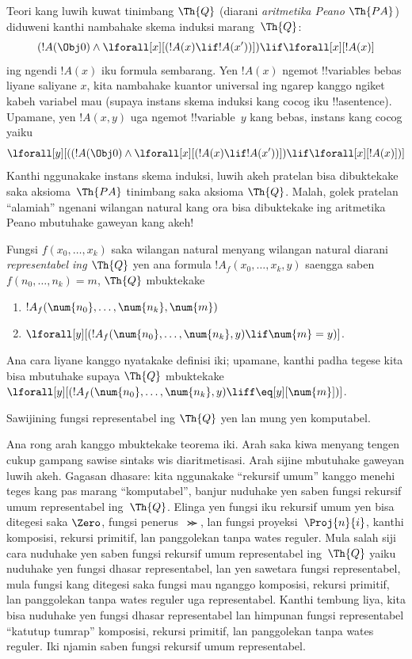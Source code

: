 \documentclass[../../../include/open-logic-section]{subfiles}
\begin{document}
Teori kang luwih kuwat tinimbang $\Th{Q}$ (diarani
\emph{aritmetika Peano} $\Th{PA}$) diduweni kanthi nambahake
skema induksi marang~$\Th{Q}$:
\[
(!A(\Obj 0) \land \lforall[x][(!A(x) \lif !A(x'))]) \lif \lforall[x][!A(x)]
\]
ing ngendi $!A(x)$ iku formula sembarang. Yen $!A(x)$ ngemot
!!{variable}s bebas liyane saliyane $x$, kita nambahake
kuantor universal ing ngarep kanggo ngiket kabeh variabel mau
(supaya instans skema induksi kang cocog iku !!a{sentence}).
Upamane, yen $!A(x, y)$ uga ngemot !!{variable}~$y$ kang
bebas, instans kang cocog yaiku
\[
\lforall[y][((!A(\Obj 0) \land \lforall[x][(!A(x) \lif !A(x'))]) \lif
  \lforall[x][!A(x)])]
\]
Kanthi nggunakake instans skema induksi, luwih akeh pratelan
bisa dibuktekake saka aksioma~$\Th{PA}$ tinimbang saka
aksioma $\Th{Q}$. Malah, golek pratelan ``alamiah'' ngenani
wilangan natural kang ora bisa dibuktekake ing aritmetika Peano
mbutuhake gaweyan kang akeh!{}

\begin{defn}
  Fungsi $f(x_0,\ldots,x_k)$ saka wilangan natural menyang
  wilangan natural diarani {\em representabel ing $\Th{Q}$} yen
  ana formula $!A_f(x_0,\dots,x_k,y)$ saengga saben
  $f(n_0,\dots,n_k) = m$, $\Th{Q}$ mbuktekake
\begin{enumerate}
\item{} $!A_f(\num{n_0}, \dots, \num{n_k}, \num{m})$
\item{} $\lforall[y][(!A_f(\num{n_0}, \dots,
\num{n_k}, y) \lif \num{m} = y)]$.
\end{enumerate}
\end{defn}

Ana cara liyane kanggo nyatakake definisi iki; upamane,
kanthi padha tegese kita bisa mbutuhake supaya $\Th{Q}$
mbuktekake $\lforall[y][(!A_f(\num{n_0}, \dots,
\num{n_k}, y) \liff \eq[y][\num{m}])]$.

\begin{thm}
Sawijining fungsi representabel ing $\Th{Q}$ yen lan mung yen komputabel.
\end{thm}

Ana rong arah kanggo mbuktekake teorema iki. Arah saka kiwa
menyang tengen cukup gampang sawise sintaks wis diaritmetisasi.
Arah sijine mbutuhake gaweyan luwih akeh. Gagasan dhasare:
kita nggunakake ``rekursif umum'' kanggo menehi teges kang
pas marang ``komputabel'', banjur nuduhake yen saben fungsi
rekursif umum representabel ing~$\Th{Q}$. Elinga yen fungsi
iku rekursif umum yen bisa ditegesi saka $\Zero$, fungsi
penerus~$\Succ$, lan fungsi proyeksi~$\Proj{n}{i}$, kanthi
komposisi, rekursi primitif, lan panggolekan tanpa wates reguler.
Mula salah siji cara nuduhake yen saben fungsi rekursif umum
representabel ing~$\Th{Q}$ yaiku nuduhake yen fungsi dhasar
representabel, lan yen sawetara fungsi representabel, mula
fungsi kang ditegesi saka fungsi mau nganggo komposisi,
rekursi primitif, lan panggolekan tanpa wates reguler uga
representabel. Kanthi tembung liya, kita bisa nuduhake yen
fungsi dhasar representabel lan himpunan fungsi representabel
``katutup tumrap'' komposisi, rekursi primitif, lan panggolekan
tanpa wates reguler. Iki njamin saben fungsi rekursif umum
representabel.
\end{document}
